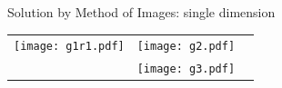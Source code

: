 \documentclass{beamer}
\begin{document}
\begin{frame}{Solution by Method of Images: single dimension}
\begin{centering}
\begin{tabular}{ccc}
\begin{minipage}{0.3\textwidth}
	\texttt{[image: g1r1.pdf]}

\end{minipage}

\pause



&



\begin{minipage}{0.3\textwidth}

	\texttt{[image: g2.pdf]}

\end{minipage}

\vspace{-15mm}

\\\hspace{-10mm}

\pause



\begin{minipage}{0.3\textwidth}

	\[ \]

\end{minipage}



&



\begin{minipage}{0.3\textwidth}

	\texttt{[image: g3.pdf]}

\end{minipage}

\vspace{-20mm}



& 



\begin{minipage}{0.3\textwidth}

	\[ \]

\end{minipage}





\end{tabular}

\end{centering}





\end{frame}
\end{document}
